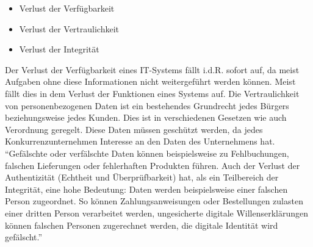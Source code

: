 \begin{itemize}
	\item Verlust der Verfügbarkeit
	\item Verlust der Vertraulichkeit
	\item Verlust der Integrität
\end{itemize}

Der Verlust der Verfügbarkeit eines IT-Systems fällt \ac{i.d.R.} sofort auf, da meist Aufgaben ohne diese Informationen nicht weitergeführt werden können. Meist fällt dies in dem Verlust der Funktionen eines Systems auf. Die Vertraulichkeit von personenbezogenen Daten ist ein bestehendes Grundrecht jedes Bürgers beziehungsweise jedes Kunden. Dies ist in verschiedenen Gesetzen wie auch Verordnung geregelt. Diese Daten müssen geschützt werden, da jedes Konkurrenzunternehmen Interesse an den Daten des Unternehmens hat. \enquote{Gefälschte oder verfälschte Daten können beispielsweise zu Fehlbuchungen, falschen Lieferungen oder fehlerhaften Produkten führen. Auch der Verlust der Authentizität (Echtheit und Überprüfbarkeit) hat, als ein Teilbereich der Integrität, eine hohe Bedeutung: Daten werden beispielsweise einer falschen Person zugeordnet. So können Zahlungsanweisungen oder Bestellungen zulasten einer dritten Person verarbeitet werden, ungesicherte digitale Willenserklärungen können falschen Personen zugerechnet werden, die digitale Identität wird	gefälscht.}\autocite[][S.1]{bundesamt_fur_sicherheit_in_der_informationstechnik_bsi_it-grundschutz-kompendium_2020}

